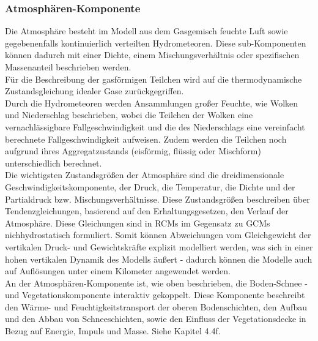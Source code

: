\subsubsection{Atmosphären-Komponente}
Die Atmosphäre besteht im Modell aus dem Gasgemisch feuchte Luft sowie gegebenenfalls kontinuierlich verteilten Hydrometeoren. Diese sub-Komponenten können dadurch mit einer Dichte, einem Mischungsverhältnis oder spezifischen Massenanteil beschrieben werden.\\
Für die Beschreibung der gasförmigen Teilchen wird auf die thermodynamische Zustandsgleichung idealer Gase zurückgegriffen.\\
Durch die Hydrometeoren werden Ansammlungen großer Feuchte, wie Wolken und Niederschlag beschrieben, wobei die Teilchen der Wolken eine vernachlässigbare Fallgeschwindigkeit und die des Niederschlags eine vereinfacht berechnete Fallgeschwindigkeit aufweisen. Zudem werden die Teilchen noch aufgrund ihres Aggregatzustands (eisförmig, flüssig oder Mischform) unterschiedlich berechnet.\\
Die wichtigsten Zustandsgrößen der Atmosphäre sind die dreidimensionale Geschwindigkeitskomponente, der Druck, die Temperatur, die Dichte und der Partialdruck bzw. Mischungsverhältnisse. Diese Zustandsgrößen beschreiben über Tendenzgleichungen, basierend auf den Erhaltungsgesetzen, den Verlauf der Atmosphäre. Diese Gleichungen sind in RCMs im Gegensatz zu GCMs nichhydrostatisch formuliert. Somit können Abweichungen vom Gleichgewicht der vertikalen Druck- und Gewichtskräfte explizit modelliert werden, was sich in einer hohen vertikalen Dynamik des Modells äußert - dadurch können die Modelle auch auf Auflösungen unter einem Kilometer angewendet werden.\\
An der Atmosphären-Komponente ist, wie oben beschrieben, die Boden-Schnee - und Vegetationskomponente interaktiv gekoppelt. Diese Komponente beschreibt den Wärme- und Feuchtigkeitstransport der oberen Bodenschichten, den Aufbau und den Abbau von Schneeschichten, sowie den Einfluss der Vegetationsdecke in Bezug auf Energie, Impuls und Masse.
Siehe \cite{RCM} Kapitel 4.4f.
